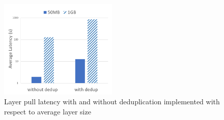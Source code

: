 \begin{figure}[t]
	\centering
			\centering
			\includegraphics[width=0.5\textwidth]{graphs/avglatency_dedup_nodedup.png}
			\caption{Layer pull latency with and without deduplication implemented with respect to average layer size}
		\label{fig:avg_latency_dedup_nodedup}
\end{figure}
